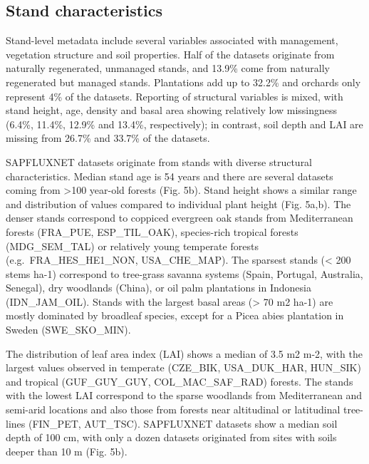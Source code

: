 \documentclass[11pt,twoside]{reedthesis}
\begin{document}
\subsection{Stand characteristics}\label{stand-characteristics}

Stand-level metadata include several variables associated with
management, vegetation structure and soil properties. Half of the
datasets originate from naturally regenerated, unmanaged stands, and
13.9\% come from naturally regenerated but managed stands. Plantations
add up to 32.2\% and orchards only represent 4\% of the datasets.
Reporting of structural variables is mixed, with stand height, age,
density and basal area showing relatively low missingness (6.4\%,
11.4\%, 12.9\% and 13.4\%, respectively); in contrast, soil depth and
LAI are missing from 26.7\% and 33.7\% of the datasets.\par

SAPFLUXNET datasets originate from stands with diverse structural
characteristics. Median stand age is 54 years and there are several
datasets coming from \textgreater{}100 year-old forests (Fig. 5b). Stand
height shows a similar range and distribution of values compared to
individual plant height (Fig. 5a,b). The denser stands correspond to
coppiced evergreen oak stands from Mediterranean forests (FRA\_PUE,
ESP\_TIL\_OAK), species-rich tropical forests (MDG\_SEM\_TAL) or
relatively young temperate forests (e.g.~FRA\_HES\_HE1\_NON,
USA\_CHE\_MAP). The sparsest stands (\textless{} 200 stems ha-1)
correspond to tree-grass savanna systems (Spain, Portugal, Australia,
Senegal), dry woodlands (China), or oil palm plantations in Indonesia
(IDN\_JAM\_OIL). Stands with the largest basal areas (\textgreater{} 70
m2 ha-1) are mostly dominated by broadleaf species, except for a Picea
abies plantation in Sweden (SWE\_SKO\_MIN).\par

The distribution of leaf area index (LAI) shows a median of 3.5 m2 m-2,
with the largest values observed in temperate (CZE\_BIK, USA\_DUK\_HAR,
HUN\_SIK) and tropical (GUF\_GUY\_GUY, COL\_MAC\_SAF\_RAD) forests. The
stands with the lowest LAI correspond to the sparse woodlands from
Mediterranean and semi-arid locations and also those from forests near
altitudinal or latitudinal tree-lines (FIN\_PET, AUT\_TSC). SAPFLUXNET
datasets show a median soil depth of 100 cm, with only a dozen datasets
originated from sites with soils deeper than 10 m (Fig. 5b).\par
\end{document}
